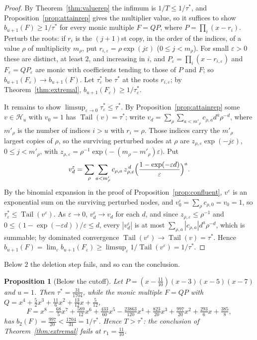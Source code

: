 \documentclass[11pt]{article}
\newtheorem{proposition}[theorem]{Proposition}
\theoremstyle{definition}
\theoremstyle{plain}
\DeclareMathOperator{\Tail}{Tail}
\begin{document}
\begin{proof}
By Theorem~\ref{thm:valuerep} the infimum is $1/T\le1/\tau^*$, and
Proposition~\ref{prop:attainrep} gives the multiplier value, so it suffices
to show $b_{u+1}(F)\ge1/\tau^*$ for every monic multiple $F=QP$, where
$P=\prod_i(x-r_i)$.  Perturb the roots: if $r_i$ is the $(j+1)$st copy, in the
order of the indices, of a value $\rho$ of multiplicity $m_\rho$, put
$r_{i,\varepsilon}=\rho\exp(j\varepsilon)$ ($0\le j<m_\rho$).  For small
$\varepsilon>0$ these are distinct, at least $2$, and increasing in $i$, and
$P_\varepsilon=\prod_i(x-r_{i,\varepsilon})$ and $F_\varepsilon=QP_\varepsilon$
are monic with coefficients tending to those of $P$ and $F$; so
$b_{u+1}(F_\varepsilon)\to b_{u+1}(F)$.  Let $\tau^*_\varepsilon$ be $\tau^*$
at the roots $r_{i,\varepsilon}$; by Theorem~\ref{thm:extremal},
$b_{u+1}(F_\varepsilon)\ge1/\tau^*_\varepsilon$.

It remains to show $\limsup_{\varepsilon\to0}\tau^*_\varepsilon\le\tau^*$.  By
Proposition~\ref{prop:attainrep} some $v\in\mathcal H_u$ with $v_0=1$ has
$\Tail(v)=\tau^*$; write
$v_d=\sum_\rho\sum_{a<m'_\rho}c_{\rho,a}d^a\rho^{-d}$, where $m'_\rho$ is the
number of indices $i>u$ with $r_i=\rho$.  Those indices carry the $m'_\rho$
largest copies of $\rho$, so the surviving perturbed nodes at $\rho$ are
$z_{\rho,\varepsilon}\exp(-j\varepsilon)$, $0\le j<m'_\rho$, with
$z_{\rho,\varepsilon}=\rho^{-1}\exp\bigl(-(m_\rho-m'_\rho)\varepsilon\bigr)$.  Put
\[
  v^\varepsilon_d=\sum_\rho\sum_{a<m'_\rho}c_{\rho,a}\,
  z_{\rho,\varepsilon}^{\,d}\Bigl(\frac{1-\exp(-\varepsilon d)}{\varepsilon}\Bigr)^a .
\]
By the binomial expansion in the proof of Proposition~\ref{prop:confluent},
$v^\varepsilon$ is an exponential sum on the surviving perturbed nodes, and
$v^\varepsilon_0=\sum_\rho c_{\rho,0}=v_0=1$, so
$\tau^*_\varepsilon\le\Tail(v^\varepsilon)$.  As $\varepsilon\to0$,
$v^\varepsilon_d\to v_d$ for each $d$, and since
$z_{\rho,\varepsilon}\le\rho^{-1}$ and
$0\le(1-\exp(-\varepsilon d))/\varepsilon\le d$, every $|v^\varepsilon_d|$ is
at most $\sum_{\rho,a}|c_{\rho,a}|d^a\rho^{-d}$, which is summable; by
dominated convergence $\Tail(v^\varepsilon)\to\Tail(v)=\tau^*$.  Hence
$b_{u+1}(F)=\lim_\varepsilon b_{u+1}(F_\varepsilon)
\ge\limsup_\varepsilon1/\Tail(v^\varepsilon)=1/\tau^*$.
\end{proof}

Below $2$ the deletion step fails, and so can the conclusion.

\begin{proposition}[Below the cutoff]\label{prop:belowtwo}
Let $P=(x-\tfrac{11}{10})(x-3)(x-5)(x-7)$ and $u=1$.  Then
$\tau^*=\tfrac{31}{1704}$, while the monic multiple $F=QP$ with
$Q=x^4+\tfrac52x^3+\tfrac{11}6x^2+\tfrac{13}{12}x+\tfrac5{12}$,
\[
  F=x^8-\tfrac{68}5x^7+\tfrac{589}{12}x^6+\tfrac{433}{60}x^5
  -\tfrac{23863}{120}x^4+\tfrac{823}{20}x^3+\tfrac{997}{20}x^2
  +\tfrac{293}6x+\tfrac{385}8,
\]
has $b_2(F)=\tfrac{997}{20}<\tfrac{1704}{31}=1/\tau^*$.  Hence
$T>\tau^*$: the conclusion of Theorem~\ref{thm:extremal} fails at
$r_1=\tfrac{11}{10}$.
\end{proposition}
\end{document}
